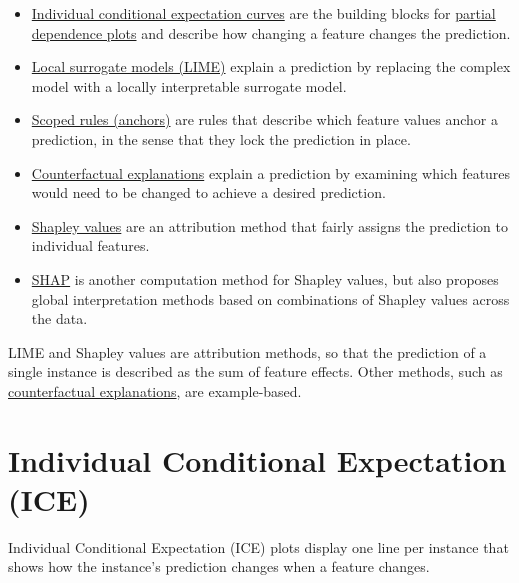 \documentclass[
  11pt,
]{scrbook}
\providecommand{\tightlist}{%
  \setlength{\itemsep}{0pt}\setlength{\parskip}{0pt}}
\begin{document}
\begin{itemize}
\tightlist
\item
  \protect\hyperlink{ice}{Individual conditional expectation curves} are the building blocks for \protect\hyperlink{pdp}{partial dependence plots} and describe how changing a feature changes the prediction.
\item
  \protect\hyperlink{lime}{Local surrogate models (LIME)} explain a prediction by replacing the complex model with a locally interpretable surrogate model.
\item
  \protect\hyperlink{anchors}{Scoped rules (anchors)} are rules that describe which feature values anchor a prediction, in the sense that they lock the prediction in place.
\item
  \protect\hyperlink{counterfactual}{Counterfactual explanations} explain a prediction by examining which features would need to be changed to achieve a desired prediction.
\item
  \protect\hyperlink{shapley}{Shapley values} are an attribution method that fairly assigns the prediction to individual features.
\item
  \protect\hyperlink{shap}{SHAP} is another computation method for Shapley values, but also proposes global interpretation methods based on combinations of Shapley values across the data.
\end{itemize}

LIME and Shapley values are attribution methods, so that the prediction of a single instance is described as the sum of feature effects.
Other methods, such as \protect\hyperlink{counterfactual}{counterfactual explanations}, are example-based.

\newpage

\hypertarget{ice}{%
\section{Individual Conditional Expectation (ICE)}\label{ice}}

Individual Conditional Expectation (ICE) plots display one line per instance that shows how the instance's prediction changes when a feature changes.
\end{document}
